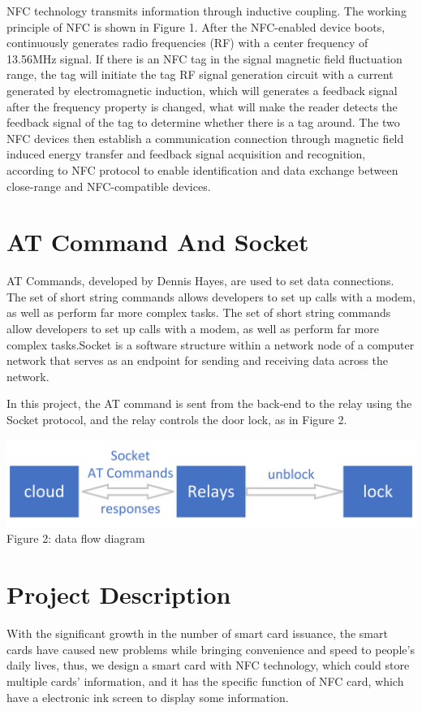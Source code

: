 \documentclass[11pt, a4paper]{article}
\begin{document}
NFC technology transmits information through inductive coupling. The working principle of NFC is shown in Figure 1. After the NFC-enabled device boots, continuously generates radio frequencies (RF) with a center frequency of 13.56MHz signal. If there is an NFC tag in the signal magnetic field fluctuation range, the tag will initiate the tag RF signal generation circuit with a current generated by electromagnetic induction, which will generates a feedback signal after the frequency property is changed, what will make the   reader detects the feedback signal of the tag to determine whether there is a tag around. The two NFC devices then establish a communication connection through magnetic field induced energy transfer and feedback signal acquisition and recognition, according to NFC protocol to enable identification and data exchange between close-range and NFC-compatible devices.

\section{AT Command And Socket}
AT Commands, developed by Dennis Hayes, are used to set data connections. The set of short string commands allows developers to set up calls with a modem, as well as perform far more complex tasks. The set of short string commands allow developers to set up calls with a modem, as well as perform far more complex tasks.Socket is a software structure within a network node of a computer network that serves as an endpoint for sending and receiving data across the network.

In this project, the AT command is sent from the back-end to the relay using the Socket protocol, and the relay controls the door lock, as in Figure 2.
\begin{center}
\includegraphics[scale=0.2]{pic2.png}
\\
Figure 2: data flow diagram
\end{center}

\section{Project Description}
With the significant growth in the number of smart card issuance, the smart cards have caused new problems while bringing convenience and speed to people's daily lives, thus, we design a smart card with NFC technology, which could store multiple cards’ information, and it has the specific function of NFC card, which have a electronic ink screen to display some information.
\end{document}

